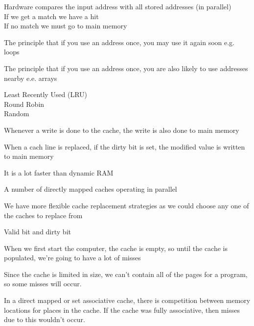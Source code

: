 
{Hardware compares the input address with all stored addresses (in parallel)\\
If we get a match we have a hit\\
If no match we must go to main memory}

{The principle that if you use an address once, you may use it again soon e.g. loops}

{The principle that if you use an address once, you are also likely to use addresses nearby e.e. arrays}

{Least Recently Used (LRU)\\
Round Robin\\
Random}

{Whenever a write is done to the cache, the write is also done to main memory}

{When a cach line is replaced, if the dirty bit is set, the modified value is written to main memory}

{It is a lot faster than dynamic RAM}

{A number of directly mapped caches operating in parallel}

{We have more flexible cache replacement strategies as we could choose any one of the caches to replace from}

{Valid bit and dirty bit}

{When we first start the computer, the cache is empty, so until the cache is populated, we're going to have a lot of misses}

{Since the cache is limited in size, we can’t contain all of the pages for a program, so some misses
will occur.}

{In a direct mapped or set associative cache, there is competition between memory locations for
places in the cache. If the cache was fully associative, then misses due to this wouldn’t occur.}
